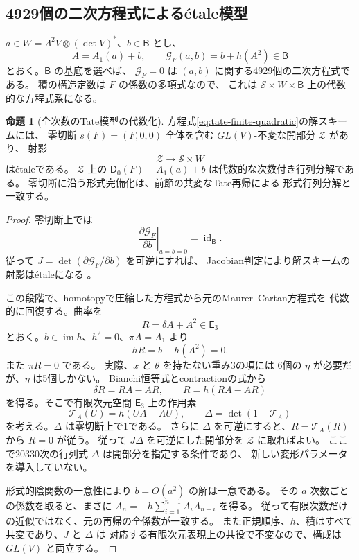 \documentclass[a4paper,11pt]{ltjsarticle}
\theoremstyle{definition}
\newtheorem{theorem}{命題}[section]
\begin{document}
\subsection{4929個の二次方程式による\'etale模型}

$a\in W=\Lambda^2V\otimes(\det V)^*$、$b\in\mathsf B$ とし、
\[
 A=A_1(a)+b,\qquad
 \mathcal G_F(a,b)=b+h(A^2)\in\mathsf B
 \tag{A2}\label{eq:tate-finite-quadratic}
\]
とおく。$\mathsf B$ の基底を選べば、
$\mathcal G_F=0$ は $(a,b)$ に関する4929個の二次方程式である。
積の構造定数は $F$ の係数の多項式なので、
これは $\mathcal S\times W\times\mathsf B$ 上の代数的な方程式系になる。

\begin{theorem}[全次数のTate模型の代数化]
\label{thm:tate-algebraization}
方程式\eqref{eq:tate-finite-quadratic}の解スキームには、
零切断 $s(F)=(F,0,0)$ 全体を含む $GL(V)$-不変な開部分 $\mathcal Z$ があり、
射影
\[
 \mathcal Z\longrightarrow\mathcal S\times W
\]
は\'etaleである。
$\mathcal Z$ 上の $\mathsf D_0(F)+A_1(a)+b$ は代数的な次数付き行列分解である。
零切断に沿う形式完備化は、前節の共変なTate再帰による
形式行列分解と一致する。
\end{theorem}
\begin{proof}
零切断上では
\[
 \left.\frac{\partial\mathcal G_F}{\partial b}\right|_{a=b=0}
       =\operatorname{id}_{\mathsf B}.
\]
従って $J=\det(\partial\mathcal G_F/\partial b)$ を可逆にすれば、
Jacobian判定により解スキームの射影は\'etaleになる
\cite[Proposition 59.26.2(3)]{StacksEtaleCriterion}。

この段階で、homotopyで圧縮した方程式から元のMaurer--Cartan方程式を
代数的に回復する。曲率を
\[
 R=\delta A+A^2\in\mathsf E_3
\]
とおく。$b\in\operatorname{im}h$、$h^2=0$、$\pi A=A_1$ より
\[
 hR=b+h(A^2)=0.
\]
また $\pi R=0$ である。
実際、$x$ と $\theta$ を持たない重み3の項には
6個の $\eta$ が必要だが、$\eta$ は5個しかない。
Bianchi恒等式とcontractionの式から
\[
 \delta R=RA-AR,\qquad R=h(RA-AR)
\]
を得る。そこで有限次元空間 $\mathsf E_3$ 上の作用素
\[
 \mathcal T_A(U)=h(UA-AU),\qquad
 \Delta=\det(1-\mathcal T_A)
\]
を考える。$\Delta$ は零切断上で1である。
さらに $\Delta$ を可逆にすると、$R=\mathcal T_A(R)$ から $R=0$ が従う。
従って $J\Delta$ を可逆にした開部分を $\mathcal Z$ に取ればよい。
ここで20330次の行列式 $\Delta$ は開部分を指定する条件であり、
新しい変形パラメータを導入していない。

形式的陰関数の一意性により $b=O(a^2)$ の解は一意である。
その $a$ 次数ごとの係数を取ると、まさに
$A_n=-h\sum_{i=1}^{n-1}A_iA_{n-i}$ を得る。
従って有限次数だけの近似ではなく、元の再帰の全係数が一致する。
また正規順序、$h$、積はすべて共変であり、$J$ と $\Delta$ は
対応する有限次元表現上の共役で不変なので、構成は $GL(V)$ と両立する。
\end{proof}
\end{document}
